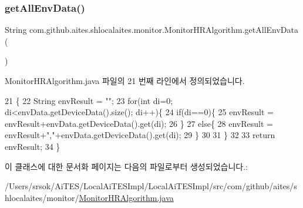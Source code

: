 \mbox{\label{classcom_1_1github_1_1aites_1_1shlocalaites_1_1monitor_1_1_monitor_h_r_algorithm_a33bf99dd8b34a44dd2126b71f868dbb1}} 
\subsubsection{\texorpdfstring{get\+All\+Env\+Data()}{getAllEnvData()}}
{\footnotesize\ttfamily String com.\+github.\+aites.\+shlocalaites.\+monitor.\+Monitor\+H\+R\+Algorithm.\+get\+All\+Env\+Data (\begin{DoxyParamCaption}{ }\end{DoxyParamCaption})}



Monitor\+H\+R\+Algorithm.\+java 파일의 21 번째 라인에서 정의되었습니다.


\begin{DoxyCode}
21                                  \{
22         String envResult = \textcolor{stringliteral}{""};
23         \textcolor{keywordflow}{for}(\textcolor{keywordtype}{int} di=0; di<envData.getDeviceData().size(); di++)\{
24             \textcolor{keywordflow}{if}(di==0)\{
25                 envResult = envResult+envData.getDeviceData().get(di);
26             \}
27             \textcolor{keywordflow}{else}\{
28                 envResult = envResult+\textcolor{stringliteral}{","}+envData.getDeviceData().get(di);
29             \}
30             
31         \}
32         
33         \textcolor{keywordflow}{return} envResult;
34     \}
\end{DoxyCode}


이 클래스에 대한 문서화 페이지는 다음의 파일로부터 생성되었습니다.\+:\begin{DoxyCompactItemize}
\item 
/\+Users/srsok/\+Ai\+T\+E\+S/\+Local\+Ai\+T\+E\+S\+Impl/\+Local\+Ai\+T\+E\+S\+Impl/src/com/github/aites/shlocalaites/monitor/\mbox{\hyperlink{_monitor_h_r_algorithm_8java}{Monitor\+H\+R\+Algorithm.\+java}}\end{DoxyCompactItemize}
